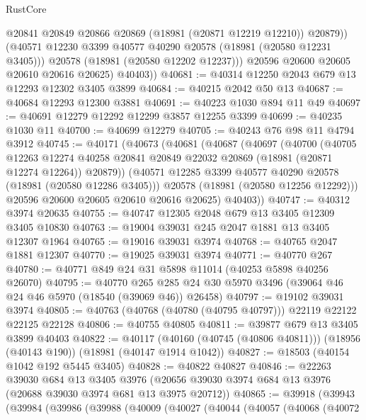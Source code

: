 \begin{lexlean}{RustCore}
\begin{coremodule}
                @20841
                @20849
                @20866
                @20869
                (@18981 (@20871 @12219 @12210))
                @20879))
            (@40571 @12230 @3399 @40577 @40290 @20578 (@18981 (@20580 @12231 @3405)))
            @20578
            (@18981 (@20580 @12202 @12237)))
          @20596
          @20600
          @20605
          @20610
          @20616
          @20625)
        @40403))
@40681 := @40314 @12250 @2043 @679 @13 @12293 @12302 @3405 @3899
@40684 := @40215 @2042 @50 @13
@40687 := @40684 @12293 @12300 @3881
@40691 := @40223 @1030 @894 @11 @49
@40697 := @40691 @12279 @12292 @12299 @3857 @12255 @3399
@40699 := @40235 @1030 @11
@40700 := @40699 @12279
@40705 := @40243 @76 @98 @11 @4794 @3912
@40745 := @40171
    (@40673
      (@40681
        (@40687
          (@40697
            (@40700
              (@40705
                @12263
                @12274
                @40258
                @20841
                @20849
                @22032
                @20869
                (@18981 (@20871 @12274 @12264))
                @20879))
            (@40571 @12285 @3399 @40577 @40290 @20578 (@18981 (@20580 @12286 @3405)))
            @20578
            (@18981 (@20580 @12256 @12292)))
          @20596
          @20600
          @20605
          @20610
          @20616
          @20625)
        @40403))
@40747 := @40312 @3974 @20635
@40755 := @40747 @12305 @2048 @679 @13 @3405 @12309 @3405 @10830
@40763 := @19004 @39031 @245 @2047 @1881 @13 @3405 @12307 @1964
@40765 := @19016 @39031 @3974
@40768 := @40765 @2047 @1881 @12307
@40770 := @19025 @39031 @3974
@40771 := @40770 @267
@40780 := @40771 @849 @24 @31 @5898 @11014 (@40253 @5898 @40256 @26070)
@40795 := @40770
    @265
    @285
    @24
    @30
    @5970
    @3496
    (@39064 @46 @24 @46 @5970 (@18540 (@39069 @46)) @26458)
@40797 := @19102 @39031 @3974
@40805 := @40763 (@40768 (@40780 (@40795 @40797))) @22119 @22122 @22125 @22128
@40806 := @40755 @40805
@40811 := @39877 @679 @13 @3405 @3899 @40403
@40822 := @40117
    (@40160 (@40745 (@40806 @40811)))
    (@18956 (@40143 @190))
    (@18981 (@40147 @1914 @1042))
@40827 := @18503 (@40154 @1042 @192 @5445 @3405)
@40828 := @40822 @40827
@40846 := @22263
    @39030
    @684
    @13
    @3405
    @3976
    (@20656 @39030 @3974 @684 @13 @3976 (@20688 @39030 @3974 @681 @13 @3975 @20712))
@40865 := @39918
    (@39943
      (@39984
        (@39986
          (@39988
            (@40009
              (@40027
                (@40044
                  (@40057
                    (@40068
                      (@40072

\end{coremodule}
\end{lexlean}
